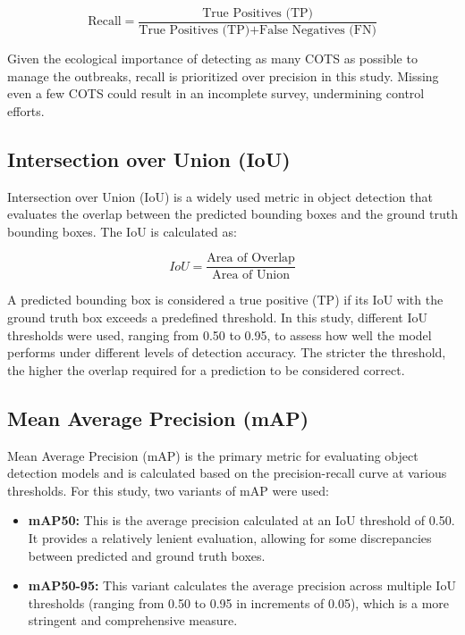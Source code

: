 \documentclass[conference]{IEEEtran}
\begin{document}
\begin{equation}
\text{Recall} = \frac{\text{True Positives (TP)}}{\text{True Positives (TP)} + \text{False Negatives (FN)}}
\end{equation}

Given the ecological importance of detecting as many COTS as possible to manage the outbreaks, recall is prioritized over precision in this study. Missing even a few COTS could result in an incomplete survey, undermining control efforts.

\subsection{Intersection over Union (IoU)}
Intersection over Union (IoU) is a widely used metric in object detection that evaluates the overlap between the predicted bounding boxes and the ground truth bounding boxes. The IoU is calculated as:

\begin{equation}
IoU = \frac{\text{Area of Overlap}}{\text{Area of Union}}
\end{equation}

A predicted bounding box is considered a true positive (TP) if its IoU with the ground truth box exceeds a predefined threshold. In this study, different IoU thresholds were used, ranging from 0.50 to 0.95, to assess how well the model performs under different levels of detection accuracy. The stricter the threshold, the higher the overlap required for a prediction to be considered correct.

\subsection{Mean Average Precision (mAP)}
Mean Average Precision (mAP) is the primary metric for evaluating object detection models and is calculated based on the precision-recall curve at various thresholds. For this study, two variants of mAP were used:

\begin{itemize}
    \item \textbf{mAP50:} This is the average precision calculated at an IoU threshold of 0.50. It provides a relatively lenient evaluation, allowing for some discrepancies between predicted and ground truth boxes.
    \item \textbf{mAP50-95:} This variant calculates the average precision across multiple IoU thresholds (ranging from 0.50 to 0.95 in increments of 0.05), which is a more stringent and comprehensive measure.
\end{itemize}
\end{document}
